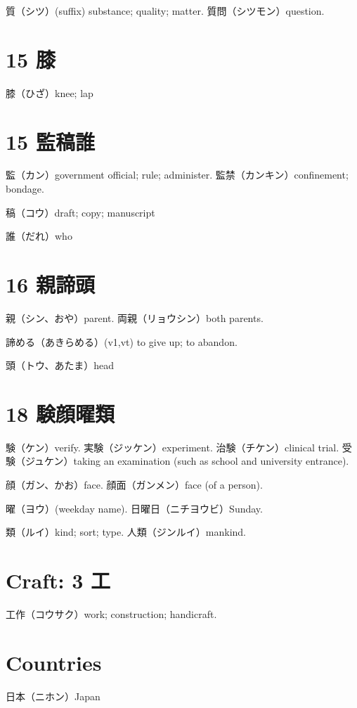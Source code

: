 質（シツ）(suffix) substance; quality; matter.
質問（シツモン）question.

\section{15 膝}

膝（ひざ）knee; lap

\section{15 監稿誰}

監（カン）government official; rule; administer.
監禁（カンキン）confinement; bondage.

稿（コウ）draft; copy; manuscript

誰（だれ）who

\section{16 親諦頭}

親（シン、おや）parent.
両親（リョウシン）both parents.

諦める（あきらめる）(v1,vt)
to give up; to abandon.

頭（トウ、あたま）head

\section{18 験顔曜類}

験（ケン）verify.
実験（ジッケン）experiment.
治験（チケン）clinical trial.
受験（ジュケン）taking an examination (such as school and university entrance).

顔（ガン、かお）face.
顔面（ガンメン）face (of a person).

曜（ヨウ）(weekday name).
日曜日（ニチヨウビ）Sunday.

類（ルイ）kind; sort; type.
人類（ジンルイ）mankind.

\section{Craft: 3 工}

工作（コウサク）work; construction; handicraft.

\section{Countries}

日本（ニホン）Japan


